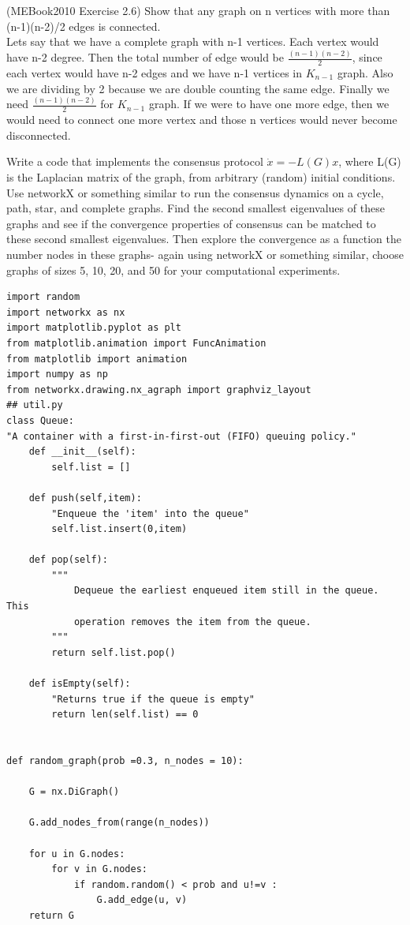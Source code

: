 \documentclass{article}
\begin{document}
\begin{problem}
    (MEBook2010 Exercise 2.6) Show that any graph on n vertices with more than (n-1)(n-2)/2 edges is connected.\\

    Lets say that we have a complete graph with n-1 vertices. Each vertex would have n-2 degree. Then the total number of edge would be $\frac {(n-1)(n-2)}{2}$, since each vertex would have n-2 edges and we have n-1 vertices in $K_{n-1}$ graph. Also we are dividing by 2 because we are double counting the same edge. Finally we need $\frac {(n-1)(n-2)}{2}$ for $K_{n-1}$ graph. If we were to have one more edge, then we would need to connect one more vertex and those n vertices would never become disconnected.
     
\end{problem}

\begin{problem}
    Write a code that implements the consensus protocol  $\dot{x}=-L(G) x$, where L(G) is the Laplacian matrix of the graph,  from arbitrary (random) initial conditions. Use networkX or something similar to run the consensus dynamics on a cycle, path, star, and complete graphs. Find the second smallest eigenvalues of these graphs and see if the convergence properties of consensus  can be matched to these second smallest eigenvalues. Then explore the convergence as a function the number  nodes in these graphs- again using networkX or something similar, choose graphs of sizes 5, 10, 20, and 50 for your computational experiments.
\end{problem}

\begin{verbatim}
import random
import networkx as nx
import matplotlib.pyplot as plt
from matplotlib.animation import FuncAnimation
from matplotlib import animation
import numpy as np
from networkx.drawing.nx_agraph import graphviz_layout
## util.py
class Queue:
"A container with a first-in-first-out (FIFO) queuing policy."
    def __init__(self):
        self.list = []

    def push(self,item):
        "Enqueue the 'item' into the queue"
        self.list.insert(0,item)

    def pop(self):
        """
            Dequeue the earliest enqueued item still in the queue. This
            operation removes the item from the queue.
        """
        return self.list.pop()

    def isEmpty(self):
        "Returns true if the queue is empty"
        return len(self.list) == 0


def random_graph(prob =0.3, n_nodes = 10):

    G = nx.DiGraph()

    G.add_nodes_from(range(n_nodes))

    for u in G.nodes:
        for v in G.nodes:
            if random.random() < prob and u!=v :
                G.add_edge(u, v)
    return G


\end{verbatim}
\end{document}
